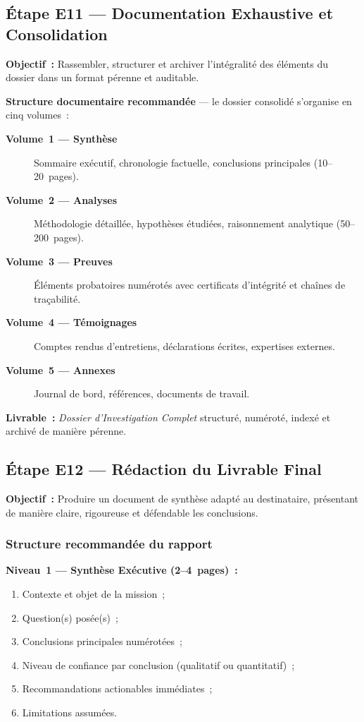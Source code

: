 \subsection{Étape E11 --- Documentation Exhaustive et Consolidation}

\textbf{Objectif~:} Rassembler, structurer et archiver l'intégralité des
éléments du dossier dans un format pérenne et auditable.

\textbf{Structure documentaire recommandée} --- le dossier consolidé
s'organise en cinq volumes~:
\begin{description}
    \item[\textbf{Volume~1 --- Synthèse}] Sommaire exécutif, chronologie
          factuelle, conclusions principales (10--20~pages).
    \item[\textbf{Volume~2 --- Analyses}] Méthodologie détaillée, hypothèses
          étudiées, raisonnement analytique (50--200~pages).
    \item[\textbf{Volume~3 --- Preuves}] Éléments probatoires numérotés avec
          certificats d'intégrité et chaînes de traçabilité.
    \item[\textbf{Volume~4 --- Témoignages}] Comptes rendus d'entretiens,
          déclarations écrites, expertises externes.
    \item[\textbf{Volume~5 --- Annexes}] Journal de bord, références,
          documents de travail.
\end{description}

\textbf{Livrable~:} \textit{Dossier d'Investigation Complet} structuré,
numéroté, indexé et archivé de manière pérenne.

\subsection{Étape E12 --- Rédaction du Livrable Final}

\textbf{Objectif~:} Produire un document de synthèse adapté au destinataire,
présentant de manière claire, rigoureuse et défendable les conclusions.

\subsubsection*{Structure recommandée du rapport}

\textbf{Niveau~1 --- Synthèse Exécutive (2--4~pages)~:}
\begin{enumerate}
    \item Contexte et objet de la mission~;
    \item Question(s) posée(s)~;
    \item Conclusions principales numérotées~;
    \item Niveau de confiance par conclusion (qualitatif ou quantitatif)~;
    \item Recommandations actionables immédiates~;
    \item Limitations assumées.
\end{enumerate}

